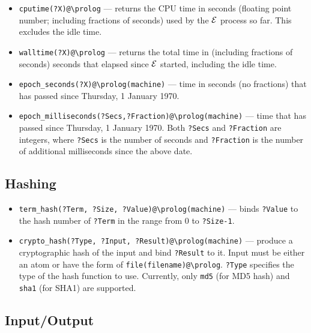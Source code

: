 \documentclass[11pt]{article}
\newcommand{\ERGO}{\mbox{\ensuremath{\cal{E}}\smaller{{\sc{RGO}}}}\xspace}
\newcommand{\FLSYSTEM}{\ERGO}
\newcommand{\bs}{\textbackslash}
\begin{document}
\begin{itemize}
\item  \texttt{cputime(?X)@\bs{}prolog}  --- returns the CPU time in seconds
  (floating point number; including fractions of seconds)
  used by the \FLSYSTEM process so far. This excludes the idle time.
\item  \texttt{walltime(?X)@\bs{}prolog}  --- returns the total time in
  (including fractions of seconds)
  seconds that elapsed since \FLSYSTEM started, including the idle time.
\item  \texttt{epoch\_seconds(?X)@\bs{}prolog(machine)} --- time in seconds
  (no fractions)
  that has passed since Thursday, 1 January 1970.
\item  \texttt{epoch\_milliseconds(?Secs,?Fraction)@\bs{}prolog(machine)}
  --- time
  that has passed since Thursday, 1 January 1970.
  Both \texttt{?Secs} and \texttt{?Fraction} are integers, where
  \texttt{?Secs} is the number of seconds and \texttt{?Fraction} is
  the number of additional milliseconds since the above date.   
\end{itemize}

\subsection{Hashing}

\begin{itemize}
\item  \texttt{term\_hash(?Term, ?Size, ?Value)@\bs{}prolog(machine)} --- binds \texttt{?Value} to
  the hash number of \texttt{?Term} in the range from 0 to
  \texttt{?Size-1}.
\item \texttt{crypto\_hash(?Type, ?Input, ?Result)@\bs{}prolog(machine)}
  --- produce a cryptographic hash of the input and bind \texttt{?Result} to it.
  Input must be either an atom or have the form of
  \texttt{file(filename)@\bs{}prolog}.
  \texttt{?Type} specifies the type of the hash function to use. Currently,
  only \texttt{md5}  (for MD5 hash) and \texttt{sha1} (for SHA1) 
  are supported.
\end{itemize}

\subsection{Input/Output}
\end{document}
